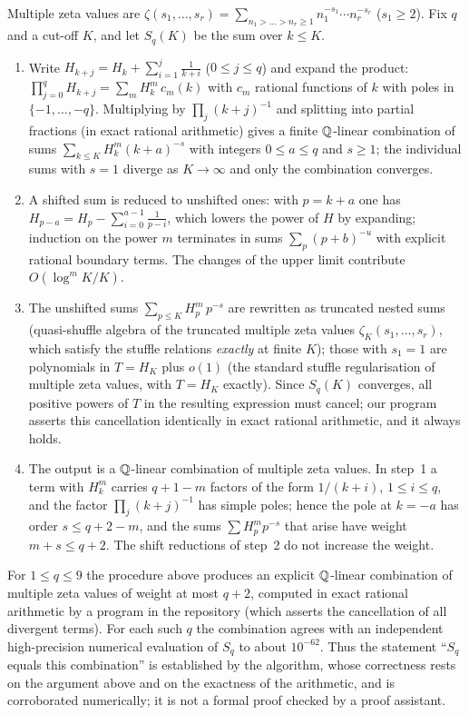 Multiple zeta values are $\zeta(s_1,\dots,s_r)=\sum_{n_1>\dots>n_r\ge1}n_1^{-s_1}\cdots n_r^{-s_r}$ ($s_1\ge2$). Fix $q$ and a cut-off $K$, and let $S_q(K)$ be the sum over $k\le K$.
\begin{enumerate}[leftmargin=2em]
\item Write $H_{k+j}=H_k+\sum_{i=1}^j\frac1{k+i}$ ($0\le j\le q$) and expand the product: $\prod_{j=0}^qH_{k+j}=\sum_mH_k^m\,c_m(k)$ with $c_m$ rational functions of $k$ with poles in $\{-1,\dots,-q\}$. Multiplying by $\prod_j(k+j)^{-1}$ and splitting into partial fractions (in exact rational arithmetic) gives a finite $\mathbb{Q}$-linear combination of sums $\sum_{k\le K}H_k^m(k+a)^{-s}$ with integers $0\le a\le q$ and $s\ge1$; the individual sums with $s=1$ diverge as $K\to\infty$ and only the combination converges.
\item A shifted sum is reduced to unshifted ones: with $p=k+a$ one has $H_{p-a}=H_p-\sum_{i=0}^{a-1}\frac1{p-i}$, which lowers the power of $H$ by expanding; induction on the power $m$ terminates in sums $\sum_p(p+b)^{-u}$ with explicit rational boundary terms. The changes of the upper limit contribute $O(\log^mK/K)$.
\item The unshifted sums $\sum_{p\le K}H_p^m\,p^{-s}$ are rewritten as truncated nested sums (quasi-shuffle algebra of the truncated multiple zeta values $\zeta_K(s_1,\dots,s_r)$, which satisfy the stuffle relations \emph{exactly} at finite $K$); those with $s_1=1$ are polynomials in $T=H_K$ plus $o(1)$ (the standard stuffle regularisation of multiple zeta values, with $T=H_K$ exactly). Since $S_q(K)$ converges, all positive powers of $T$ in the resulting expression must cancel; our program asserts this cancellation identically in exact rational arithmetic, and it always holds.
\item The output is a $\mathbb{Q}$-linear combination of multiple zeta values. In step~1 a term with $H_k^m$ carries $q+1-m$ factors of the form $1/(k+i)$, $1\le i\le q$, and the factor $\prod_j(k+j)^{-1}$ has simple poles; hence the pole at $k=-a$ has order $s\le q+2-m$, and the sums $\sum H_p^m p^{-s}$ that arise have weight $m+s\le q+2$. The shift reductions of step~2 do not increase the weight.
\end{enumerate}

\begin{proposition}\label{thm:harmonic}
For $1\le q\le9$ the procedure above produces an explicit $\mathbb{Q}$-linear combination of multiple zeta values of weight at most $q+2$, computed in exact rational arithmetic by a program in the repository (which asserts the cancellation of all divergent terms). For each such $q$ the combination agrees with an independent high-precision numerical evaluation of $S_q$ to about $10^{-62}$. Thus the statement ``$S_q$ equals this combination'' is established by the algorithm, whose correctness rests on the argument above and on the exactness of the arithmetic, and is corroborated numerically; it is not a formal proof checked by a proof assistant.
\end{proposition}

